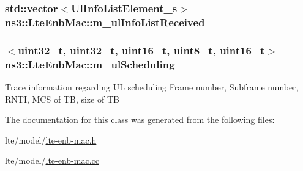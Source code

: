 \subsubsection[{\texorpdfstring{m\+\_\+ul\+Info\+List\+Received}{m_ulInfoListReceived}}]{\setlength{\rightskip}{0pt plus 5cm}std\+::vector$<${\bf Ul\+Info\+List\+Element\+\_\+s}$>$ ns3\+::\+Lte\+Enb\+Mac\+::m\+\_\+ul\+Info\+List\+Received\hspace{0.3cm}{\ttfamily [private]}}\hypertarget{classns3_1_1LteEnbMac_afe760dd4bbfb8ce89febb8f2265edd5e}{}\label{classns3_1_1LteEnbMac_afe760dd4bbfb8ce89febb8f2265edd5e}
\subsubsection[{\texorpdfstring{m\+\_\+ul\+Scheduling}{m_ulScheduling}}]{$<$uint32\+\_\+t, uint32\+\_\+t, uint16\+\_\+t, uint8\+\_\+t, uint16\+\_\+t$>$ ns3\+::\+Lte\+Enb\+Mac\+::m\+\_\+ul\+Scheduling\hspace{0.3cm}{\ttfamily [private]}}\hypertarget{classns3_1_1LteEnbMac_aab6ec5d4fdeca697abea609fa10d7df5}{}\label{classns3_1_1LteEnbMac_aab6ec5d4fdeca697abea609fa10d7df5}
Trace information regarding UL scheduling Frame number, Subframe number, R\+N\+TI, M\+CS of TB, size of TB 

The documentation for this class was generated from the following files\+:\begin{DoxyCompactItemize}
\item 
lte/model/\hyperlink{lte-enb-mac_8h}{lte-\/enb-\/mac.\+h}\item 
lte/model/\hyperlink{lte-enb-mac_8cc}{lte-\/enb-\/mac.\+cc}\end{DoxyCompactItemize}
